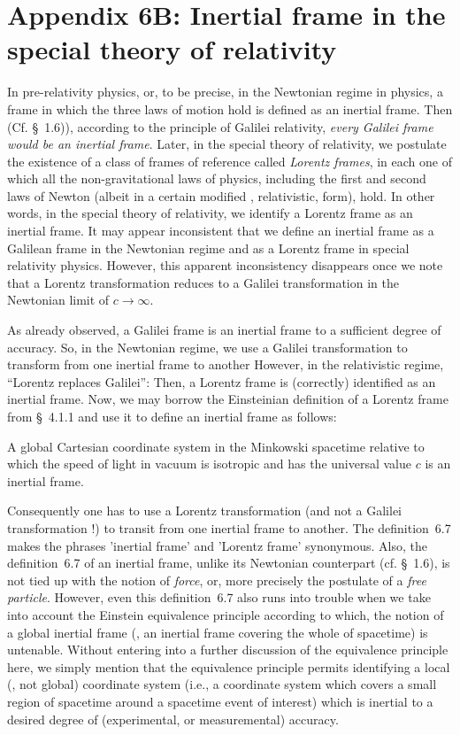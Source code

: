 \section{Appendix 6B: Inertial frame in the\\ special 
theory 
of relativity}
 In 
pre-relativity 
physics, or, to be precise, in the  Newtonian regime 
in 
physics, a frame in which the three laws of motion hold 
is 
defined as an inertial frame. Then (Cf. \S~1.6)),  
according 
to the principle of Galilei relativity, \textsl{every 
Galilei frame would be an inertial frame}. Later, in 
the 
special theory of relativity, we postulate the 
existence of 
a  class of frames of reference called \textsl{Lorentz 
frames}, in each one of which all the  
non-gravitational 
laws of physics, including the first and second laws 
of 
Newton (albeit in a certain modified  \ie, 
relativistic, 
form), hold. In other words, in the special theory of 
relativity,  we  identify a Lorentz frame as an 
inertial 
frame. It may appear inconsistent that we define an 
inertial 
frame as a Galilean frame in the  Newtonian regime and 
as a 
Lorentz frame in special relativity physics. However, 
this 
apparent inconsistency disappears once we note that a 
Lorentz transformation reduces to a Galilei 
transformation 
in the Newtonian limit of $c\rightarrow \infty$.

As already observed, a Galilei frame is an inertial 
frame 
{to a sufficient degree of accuracy}. So, in the 
Newtonian 
regime, we use a Galilei transformation to transform 
from 
one inertial frame to another  However, in the  
relativistic 
regime, ``Lorentz replaces  Galilei'':  Then, a 
Lorentz 
frame is (correctly) identified as an inertial frame. 
Now, we may borrow the Einsteinian definition of a 
Lorentz 
frame from \S~4.1.1 and use it to define an inertial 
frame as follows:

 A global Cartesian coordinate 
system 
in the Minkowski spacetime relative to which the speed 
of 
light in vacuum is isotropic and has the universal 
value $c$ 
is an inertial frame. 

Consequently one has to use a Lorentz transformation 
(and 
not a Galilei transformation !) to transit from one 
inertial frame to another. The definition~6.7 makes
the phrases 'inertial  frame' and 'Lorentz frame' 
synonymous. Also, the definition~6.7 of an inertial 
frame, 
unlike its Newtonian counterpart (cf. \S~1.6), is not 
tied 
up with the notion of \textsl{force}, or, more 
precisely the 
postulate of a  \textsl{free particle}.  However, even 
this 
definition~6.7 also runs into trouble when we take 
into 
account the Einstein equivalence principle according 
to 
which, the notion of a global inertial frame (\ie, an 
inertial frame covering the whole of spacetime) is  
untenable. Without entering into a further discussion 
of the 
equivalence principle here, we simply mention that the 
equivalence principle permits identifying a local (\ie, 
not 
global) coordinate system (i.e., a coordinate system 
which 
covers a small region of spacetime around a spacetime 
event 
of interest) which is {inertial} to a desired degree 
of 
(experimental, or measuremental) accuracy. 

